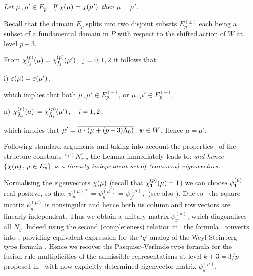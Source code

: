  {\it Let $\mu\,, \mu'\in E_p\,.$ 
If $\chi(\mu)= \chi(\mu')$ then $\mu=\mu'$.}

\PROOF 
Recall that the  domain $E_p$ splits into two disjoint subsets
$E_p^{(\pm)}$ each being a subset of a fundamental domain in $P$
with respect to the shifted action of $W$ at level $p-3$.


{}From $\chi_{f_j}^{(p)}(\mu)= \chi_{f_j}^{(p)}(\mu')\,,\
j=0,1,2$  it follows that:

i) $\varepsilon(\mu)=\varepsilon(\mu')$,

\noindent
which  implies that both $\mu\,, \mu'
\in E_p^{(+)}$, or $\mu\,, \mu' \in E_p^{(-)}$, 

ii) $\overline{\chi}_{\bar{\Lambda}_i}^{(p)}(\mu)\,
=\overline{\chi}_{\bar{\Lambda}_i}^{(p)}(\mu')\,, \quad i=1,2\,,$ 

\noindent
which implies that $\mu'=\overline{w\cdot(\mu+(p-3)\Lambda_0)}\,, 
\, w\in W$. Hence  $\mu=\mu'$.
\endPROOF


Following standard arguments and taking into account the
properties \qinvo\ of the structure constants ${}^{(p)}N_{x,
y}^z$ the Lemma immediately leads to:
%
\eqn{}
%
{\it and hence  $\{\chi(\mu)\,, \, \mu\in E_p\}$   is a linearly
independent set of (common) eigenvectors.}

Normalising the eigenvectors $\chi(\mu)$ (recall that 
$\chi_{{\bf 1}}^{(p)}(\mu)=1$)
%
\eqn{}
%
we can choose $\psi_{{\bf 1}}^{(\mu)}$ real positive, so that
$\psi_y^{(\mu)\,*}=\psi_y^{(\mu^*)}=\psi_{y^*}^{(\mu)}\,,$ (see 
also \chpr{}).  Due to \funi\ the  square matrix $\psi_y^{(\mu)}$
is nonsingular and hence both its column and row vectors are
linearly 
independent. Thus we obtain a unitary matrix $\psi_y^{(\mu)}$,
%
\eqn\uni{
\sum_{y\in \CC_p}\,\psi_y^{(\mu)}\ \psi_y^{(\mu') *}=\zd_{\mu\,
\mu'}\,, \quad \sum_{\mu\in E_p}\,\psi_y^{(\mu)}\ 
\psi_x^{(\mu) *}=\zd_{y\, x}\,,
}
%
which diagonalises all $N_y$.  Indeed  using the second
(completeness) relation in \uni\ the formula  \qweyl\ converts
into \pasv, providing equivalent expression for the `$q$' analog
of the Weyl-Steinberg type formula \qstrc.  Hence  we recover the
Pasquier--Verlinde type formula for the fusion rule
multiplicities of the admissible representations at level
$k+3=3/p$ proposed in \FGP\ with now explicitly determined
eigenvector matrix $\psi_y^{(\mu)}$.

